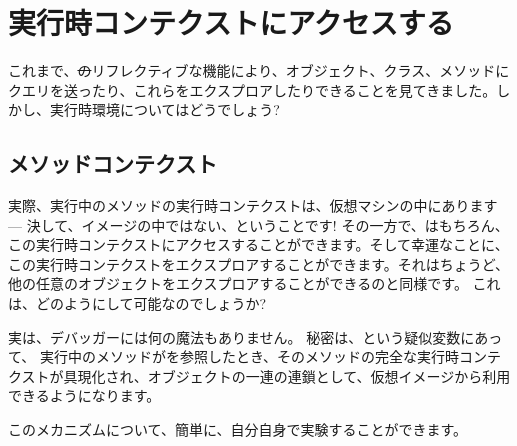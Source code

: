 \documentclass[a4paper,10pt,twoside]{book}
\begin{document}
\section{実行時コンテクストにアクセスする}

これまで、\st のリフレクティブな機能により、オブジェクト、クラス、メソッドにクエリを送ったり、これらをエクスプロアしたりできることを見てきました。しかし、実行時環境についてはどうでしょう?

\subsection{メソッドコンテクスト}

実際、実行中のメソッドの実行時コンテクストは、仮想マシンの中にあります --- 決して、イメージの中ではない、ということです!
その一方で、はもちろん、この実行時コンテクストにアクセスすることができます。そして幸運なことに、この実行時コンテクストをエクスプロアすることができます。それはちょうど、他の任意のオブジェクトをエクスプロアすることができるのと同様です。
これは、どのようにして可能なのでしょうか?

実は、デバッガーには何の魔法もありません。
秘密は、という疑似変数にあって、%
実行中のメソッドがを参照したとき、そのメソッドの完全な実行時コンテクストが具現化され、オブジェクトの一連の連鎖として、仮想イメージから利用できるようになります。

このメカニズムについて、簡単に、自分自身で実験することができます。
\end{document}
